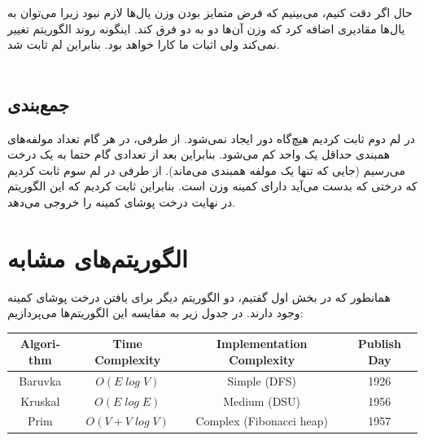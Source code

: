 \documentclass[11pt, oneside]{article}
\begin{document}
حال اگر دقت کنیم، می‌بینیم که فرض متمایز بودن وزن یال‌ها لازم نبود زیرا می‌توان به یال‌ها مقادیری اضافه کرد که وزن آن‌ها دو به دو فرق کند. اینگونه روند الگوریتم تغییر نمی‌کند ولی اثبات ما کارا خواهد بود. بنابراین لم ثابت شد.
\\
\\
\subsection{جمع‌بندی}
در لم دوم ثابت کردیم هیچ‌گاه دور ایجاد نمی‌شود. از طرفی، در هر گام تعداد مولفه‌های همبندی حداقل یک واحد کم می‌شود.
بنابراین بعد از تعدادی گام حتما به یک درخت می‌رسیم (جایی که تنها یک مولفه همبندی می‌ماند).
از طرفی در لم سوم ثابت کردیم که درختی که بدست می‌آید دارای کمینه وزن است. بنابراین ثابت کردیم که این الگوریتم در نهایت درخت پوشای کمینه را خروجی می‌دهد.

\section{الگوریتم‌های مشابه}\label{الگوریتم‌های مشابه}
همانطور که در بخش اول گفتیم، دو الگوریتم دیگر برای یافتن درخت پوشای کمینه وجود دارند. در جدول زیر به مقایسه این الگوریتم‌ها می‌پردازیم:

\begin{latin}
    \begin{center}
        \begin{tabular}{||c c c c||} 
        \hline
        Algorithm & Time Complexity & Implementation Complexity & Publish Day \\ [0.5ex] 
        \hline\hline
        Baruvka & $O(E \; log \; V)$ & Simple (DFS) & 1926 \\ 
        \hline
        Kruskal & $O(E \; log \; E)$ & Medium (DSU) & 1956 \\
        \hline
        Prim & $O(V + V \; log \; V)$ & Complex (Fibonacci heap) & 1957 \\
        \hline
        \end{tabular}
    \end{center}
\end{latin}






\pagebreak
\linespread{1.0}
\latinfont


\printendnotes[custom]
\end{document}
